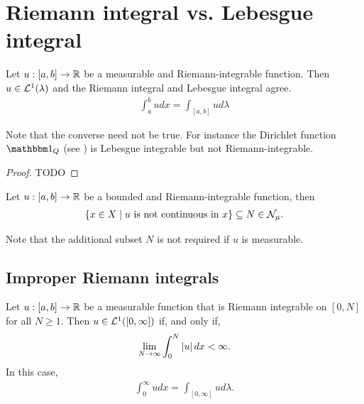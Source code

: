 \section{Riemann integral vs. Lebesgue integral}

\begin{thm}
	Let $u: [a, b] \to \mathbb{R}$ be a measurable and Riemann-integrable function. Then $u \in \mathcal{L}^1(\lambda)$ and the Riemann integral and Lebesgue integral agree.
	\begin{align}
		\int_a^b u dx = \int_{[a, b]} u d\lambda
	\end{align}
\end{thm}

\begin{remark}
	Note that the converse need not be true. For instance the Dirichlet function $\ind_{Q}$ (see \cite{dirichlet}) is Lebesgue integrable but not Riemann-integrable.
\end{remark}

\begin{proof}
	TODO
\end{proof}

\begin{thm}
	Let $u:[a, b] \to \mathbb{R}$ be a bounded and Riemann-integrable function, then
	\begin{align}
		\{x \in X \mid u \text{ is not continuous in } x\} \subseteq N \in \mathcal{N}_\mu.
	\end{align}
\end{thm}

Note that the additional subset $N$ is not required if $u$ is measurable.

\subsection{Improper Riemann integrals}

\begin{cor}
	\label{cor:improper-riemann}
	Let $u:[a, b] \to \mathbb{R}$ be a measurable function that is Riemann integrable on $[0, N]$ for all $N\geq 1$. Then $u \in \mathcal{L}^1([0,\infty])$ if, and only if,
	\begin{align}
		\lim_{N\to\infty} \int_0^N \left\vert{u}\right\vert dx < \infty.
	\end{align}
	In this case,
	\begin{align*}
		\int_0^\infty udx = \int_{[0, \infty]} u d\lambda.
	\end{align*}
\end{cor}